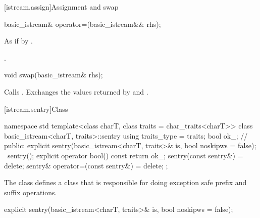 [istream.assign]{Assignment and swap}

%
\begin{itemdecl}
basic_istream& operator=(basic_istream&& rhs);
\end{itemdecl}

\begin{itemdescr}
\pnum
\effects As if by .

\pnum
\returns {}.
\end{itemdescr}

%
\begin{itemdecl}
void swap(basic_istream& rhs);
\end{itemdecl}

\begin{itemdescr}
\pnum
\effects Calls .
Exchanges the values returned by  and
.
\end{itemdescr}

[istream.sentry]{Class }

%
%
\begin{codeblock}
namespace std {
  template<class charT, class traits = char_traits<charT>>
  class basic_istream<charT, traits>::sentry {
    using traits_type = traits;
    bool ok_; // \expos
  public:
    explicit sentry(basic_istream<charT, traits>& is, bool noskipws = false);
    ~sentry();
    explicit operator bool() const { return ok_; }
    sentry(const sentry&) = delete;
    sentry& operator=(const sentry&) = delete;
  };
}
\end{codeblock}

\begin{itemdescr}
\pnum
The class
defines a class that is responsible for doing exception safe prefix and suffix
operations.
\end{itemdescr}

%
%
\begin{itemdecl}
explicit sentry(basic_istream<charT, traits>& is, bool noskipws = false);
\end{itemdecl}

